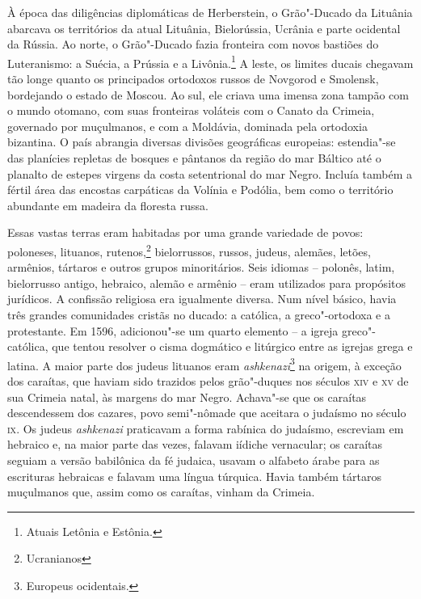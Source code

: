 À época das diligências diplomáticas de Herberstein, o Grão"-Ducado da
Lituânia abarcava os territórios da atual Lituânia, Bielorússia, Ucrânia
e parte ocidental da Rússia. Ao norte, o Grão"-Ducado fazia fronteira com
novos bastiões do Luteranismo: a Suécia, a Prússia e a Livônia.\footnote{Atuais
Letônia e Estônia.} A leste, os limites ducais chegavam tão longe quanto
os principados ortodoxos russos de Novgorod e Smolensk, bordejando o
estado de Moscou. Ao sul, ele criava uma imensa zona tampão com o mundo
otomano, com suas fronteiras voláteis com o Canato da Crimeia, governado
por muçulmanos, e com a Moldávia, dominada pela ortodoxia bizantina. O
país abrangia diversas divisões geográficas europeias: estendia"-se das
planícies repletas de bosques e pântanos da região do mar Báltico até o
planalto de estepes virgens da costa setentrional do mar Negro. Incluía
também a fértil área das encostas carpáticas da Volínia e Podólia, bem
como o território abundante em madeira da floresta russa.

Essas vastas terras eram habitadas por uma grande variedade de povos:
poloneses, lituanos, rutenos,\footnote{Ucranianos} bielorrussos, russos, judeus,
alemães, letões, armênios, tártaros e outros grupos minoritários. Seis
idiomas -- polonês, latim, bielorrusso antigo, hebraico, alemão e armênio --
eram utilizados para propósitos jurídicos. A confissão religiosa era
igualmente diversa. Num nível básico, havia três grandes comunidades
cristãs no ducado: a católica, a greco"-ortodoxa e a protestante. Em
1596, adicionou"-se um quarto elemento -- a igreja greco"-católica, que
tentou resolver o cisma dogmático e litúrgico entre as igrejas grega e
latina. A maior parte dos judeus lituanos eram \textit{ashkenazi}\footnote{Europeus
ocidentais.} na origem, à exceção dos caraítas, que haviam sido trazidos
pelos grão"-duques nos séculos \textsc{xiv} e \textsc{xv} de sua Crimeia natal, às margens
do mar Negro. Achava"-se que os caraítas descendessem dos cazares, povo
semi"-nômade que aceitara o judaísmo no século \textsc{ix}. Os judeus \textit{ashkenazi}
praticavam a forma rabínica do judaísmo, escreviam em hebraico e, na
maior parte das vezes, falavam iídiche vernacular; os caraítas seguiam a
versão babilônica da fé judaica, usavam o alfabeto árabe para as
escrituras hebraicas e falavam uma língua túrquica. Havia também
tártaros muçulmanos que, assim como os caraítas, vinham da Crimeia.

